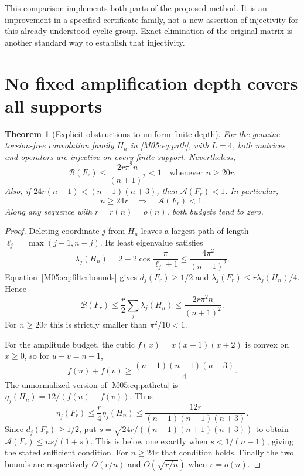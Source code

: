 \documentclass[11pt,a4paper,oneside]{report}
\newtheorem{theorem}{Theorem}[section]
\theoremstyle{definition}
\theoremstyle{remark}
\newcommand{\BB}{\mathcal B}
\newcommand{\ABudget}{\mathcal A}
\begin{document}
This comparison implements both parts of the proposed method.
It is an improvement in a specified certificate family, not a
new assertion of injectivity for this already understood cyclic
group. Exact elimination of the original matrix is another
standard way to establish that injectivity.

\section{No fixed amplification depth covers all supports}
\label{M05:sec:fixed}

\begin{theorem}[Explicit obstructions to uniform finite depth]
\label{M05:thm:fixed}
For the genuine torsion-free convolution family $H_n$ in
\eqref{M05:eq:path}, with $L=4$, both matrices and operators are
injective on every finite support. Nevertheless,
\begin{equation}\label{M05:eq:fixedB}
 \BB(F_r)\le\frac{2r\pi^2n}{(n+1)^2}<1
 \quad\text{whenever }n\ge20r.
\end{equation}
Also, if
$24r(n-1)<(n+1)(n+3)$, then $\ABudget(F_r)<1$.
In particular,
\begin{equation}\label{M05:eq:fixedA}
 n\ge24r\quad\Longrightarrow\quad \ABudget(F_r)<1 .
\end{equation}
Along any sequence with $r=r(n)=o(n)$, both budgets tend to zero.
\end{theorem}
\begin{proof}
Deleting coordinate $j$ from $H_n$ leaves a largest path of length
$\ell_j=\max(j-1,n-j)$. Its least eigenvalue satisfies
\[
 \lambda_j(H_n)=2-2\cos\frac{\pi}{\ell_j+1}
 \le\frac{4\pi^2}{(n+1)^2}.
\]
Equation~\eqref{M05:eq:filterbounds} gives
$d_j(F_r)\ge1/2$ and
$\lambda_j(F_r)\le r\lambda_j(H_n)/4$. Hence
\[
 \BB(F_r)\le\frac r2\sum_j\lambda_j(H_n)
 \le\frac{2r\pi^2n}{(n+1)^2}.
\]
For $n\ge20r$ this is strictly smaller than
$\pi^2/10<1$.

For the amplitude budget, the cubic
$f(x)=x(x+1)(x+2)$ is convex on $x\ge0$, so for
$u+v=n-1$,
\[
 f(u)+f(v)\ge\frac{(n-1)(n+1)(n+3)}4.
\]
The unnormalized version of \eqref{M05:eq:patheta} is
$\eta_j(H_n)=12/(f(u)+f(v))$. Thus
\[
 \eta_j(F_r)\le\frac r4\eta_j(H_n)
 \le\frac{12r}{(n-1)(n+1)(n+3)}.
\]
Since $d_j(F_r)\ge1/2$, put
$s=\sqrt{24r/((n-1)(n+1)(n+3))}$ to obtain
$\ABudget(F_r)\le ns/(1+s)$.
This is below one exactly when $s<1/(n-1)$, giving the stated
sufficient condition. For $n\ge24r$ that condition holds.
Finally the two bounds are respectively $O(r/n)$ and
$O(\sqrt{r/n})$ when $r=o(n)$.
\end{proof}
\end{document}
